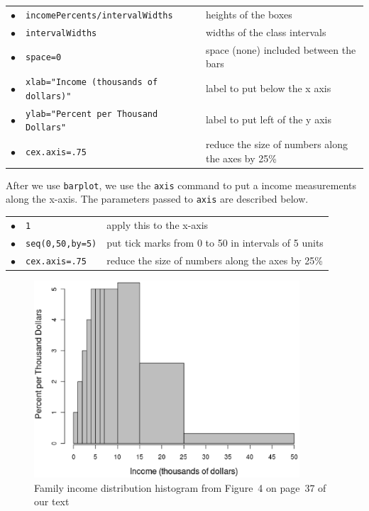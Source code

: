 \documentclass[10pt]{article}
\begin{document}
\begin{tabular}{cll}
$\bullet$ &  \texttt{incomePercents/intervalWidths} & heights of the boxes\\
$\bullet$ &  \texttt{intervalWidths} & widths of the class intervals\\
$\bullet$ &  \texttt{space=0}        & space (none) included between the bars\\
$\bullet$ &  \texttt{xlab="Income (thousands of dollars)"} &  label to put below the x axis\\
$\bullet$ &  \texttt{ylab="Percent per Thousand Dollars"}  &  label to put left of the y axis\\
$\bullet$ &  \texttt{cex.axis=.75}   & reduce the size of numbers along the axes by 25\%\\
\end{tabular}

After we use \texttt{barplot}, we use the \texttt{axis} command to put a income measurements
along the x-axis.  The parameters passed to \texttt{axis} are described below.

\begin{tabular}{cll}
$\bullet$ &  \texttt{1} & apply this to the x-axis\\
$\bullet$ &  \texttt{seq(0,50,by=5)} & put tick marks from 0 to 50 in intervals of 5 units\\
$\bullet$ &  \texttt{cex.axis=.75}   & reduce the size of numbers along the axes by 25\%\\
\end{tabular}
\vfill
\eject

\begin{figure}[h]
\begin{center}
\includegraphics[height=2.9in, bb=0 16 550 380, clip]{Fig4p37.eps}
\caption{\label{fig:incomes}Family income distribution histogram from Figure~4 on page~37 of our text}\vspace{-1in}
\end{center}
\end{figure}
\vspace{1in}
\end{document}
